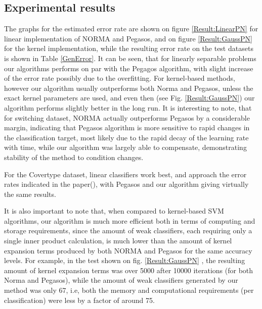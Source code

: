 \subsection{Experimental results}
The graphs for the estimated error rate are shown on figure \ref{Result:LinearPN} for linear implementation of NORMA and Pegasos, and on figure \ref{Result:GaussPN} for the kernel implementation, while the resulting error rate on the test datasets is shown in Table \ref{GenError}.
It can be  seen, that for linearly separable problems our algorithms performs on par with the Pegagos algorithm, with slight increase of the error rate possibly due to the overfitting. For kernel-based methods, however our algorithm usually outperforms both Norma and Pegasos, unless the exact kernel parameters are used, and even then (see Fig. \ref{Result:GaussPN}) our algorithm performs slightly better in the long run. It is interesting to note, that for switching dataset, NORMA actually outperforms Pegasos by a considerable margin, indicating that Pegasos algorithm is more sensitive to rapid changes in the classification target, most likely due to the rapid decay of the learning rate with time, while our algorithm was largely able to compensate, demonstrating stability of the method to condition changes. 

For the Covertype dataset, linear classifiers work best, and approach the error rates indicated in the paper(\cite{Forest}), with Pegasos and our algorithm giving virtually the same results. 

It is also important to note that, when compared to kernel-based SVM algorithms, our algorithm is much more efficient both in terms of computing and storage requirements, since the amount of weak classifiers, each requiring only a single inner product calculation, is much lower than the amount of kernel expansion terms produced by both NORMA and Pegasos for the same accuracy levels. For example, in the test shown on fig. \ref{Result:GaussPN} ,  the resulting amount of kernel expansion terms was over 5000 after 10000 iterations (for both Norma and Pegasos), while the amount of weak classifiers generated by our method was only 67, i.e, both the memory and computational requirements (per classification) were less by a factor of around 75. 

